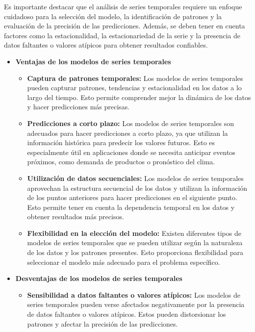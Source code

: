 Es importante destacar que el análisis de series temporales requiere un enfoque cuidadoso para la selección del modelo, la identificación de patrones y la evaluación de la precisión de las predicciones. Además, se deben tener en cuenta factores como la estacionalidad, la estacionariedad de la serie y la presencia de datos faltantes o valores atípicos para obtener resultados confiables.

\begin{itemize}
    \item \textbf{Ventajas de los modelos de series temporales}
    \begin{itemize}
        \item \textbf{Captura de patrones temporales:} Los modelos de series temporales pueden capturar patrones, tendencias y estacionalidad en los datos a lo largo del tiempo. Esto permite comprender mejor la dinámica de los datos y hacer predicciones más precisas.
        \item \textbf{Predicciones a corto plazo:} Los modelos de series temporales son adecuados para hacer predicciones a corto plazo, ya que utilizan la información histórica para predecir los valores futuros. Esto es especialmente útil en aplicaciones donde se necesita anticipar eventos próximos, como demanda de productos o pronóstico del clima.
        \item \textbf{Utilización de datos secuenciales:} Los modelos de series temporales aprovechan la estructura secuencial de los datos y utilizan la información de los puntos anteriores para hacer predicciones en el siguiente punto. Esto permite tener en cuenta la dependencia temporal en los datos y obtener resultados más precisos.
        \item \textbf{Flexibilidad en la elección del modelo:} Existen diferentes tipos de modelos de series temporales que se pueden utilizar según la naturaleza de los datos y los patrones presentes. Esto proporciona flexibilidad para seleccionar el modelo más adecuado para el problema específico.
    \end{itemize}
    \item \textbf{Desventajas de los modelos de series temporales}
    \begin{itemize}
        \item \textbf{Sensibilidad a datos faltantes o valores atípicos:} Los modelos de series temporales pueden verse afectados negativamente por la presencia de datos faltantes o valores atípicos. Estos pueden distorsionar los patrones y afectar la precisión de las predicciones.

\end{itemize}
\end{itemize}
